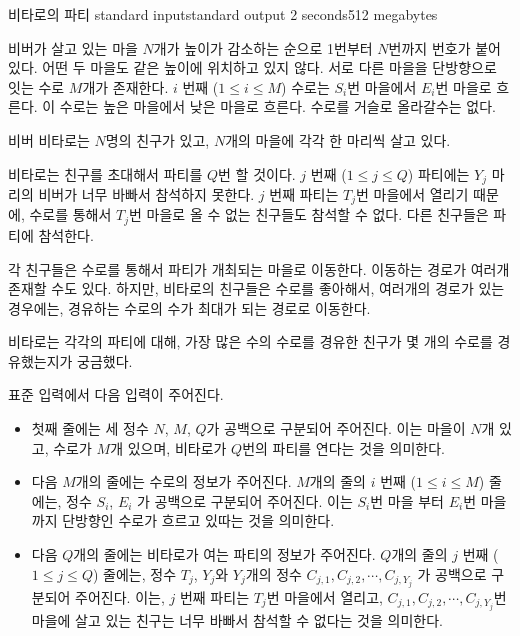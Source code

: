 \begin{problem}{비타로의 파티}
	{standard input}{standard output}
	{2 seconds}{512 megabytes}{}
	
	비버가 살고 있는 마을 $N$개가 높이가 감소하는 순으로 1번부터 $N$번까지 번호가 붙어있다. 어떤 두 마을도 같은 높이에 위치하고 있지 않다. 서로 다른 마을을 단방향으로 잇는 수로 $M$개가 존재한다. $i$ 번째 ($1 \le i \le M$) 수로는 $S_i$번 마을에서 $E_i$번 마을로 흐른다. 이 수로는 높은 마을에서 낮은 마을로 흐른다. 수로를 거슬로 올라갈수는 없다.
	
	비버 비타로는 $N$명의 친구가 있고, $N$개의 마을에 각각 한 마리씩 살고 있다.
	
	비타로는 친구를 초대해서 파티를 $Q$번 할 것이다. $j$ 번째 ($1 \le j \le Q$) 파티에는 $Y_j$ 마리의 비버가 너무 바빠서 참석하지 못한다. $j$ 번째 파티는 $T_j$번 마을에서 열리기 때문에, 수로를 통해서 $T_j$번 마을로 올 수 없는 친구들도 참석할 수 없다. 다른 친구들은 파티에 참석한다.
	
	각 친구들은 수로를 통해서 파티가 개최되는 마을로 이동한다. 이동하는 경로가 여러개 존재할 수도 있다. 하지만, 비타로의 친구들은 수로를 좋아해서, 여러개의 경로가 있는 경우에는, 경유하는 수로의 수가 최대가 되는 경로로 이동한다.
	
	비타로는 각각의 파티에 대해, 가장 많은 수의 수로를 경유한 친구가 몇 개의 수로를 경유했는지가 궁금했다.

	\InputFile
	
	표준 입력에서 다음 입력이 주어진다.
	
	\begin{itemize}
		\item 첫째 줄에는 세 정수 $N$, $M$, $Q$가 공백으로 구분되어 주어진다. 이는 마을이 $N$개 있고, 수로가 $M$개 있으며, 비타로가 $Q$번의 파티를 연다는 것을 의미한다.
		\item 다음 $M$개의 줄에는 수로의 정보가 주어진다. $M$개의 줄의 $i$ 번째 ($1 \le i \le M$) 줄에는, 정수 $S_i$, $E_i$ 가 공백으로 구분되어 주어진다. 이는 $S_i$번 마을 부터 $E_i$번 마을 까지 단방향인 수로가 흐르고 있따는 것을 의미한다.
		\item 다음 $Q$개의 줄에는 비타로가 여는 파티의 정보가 주어진다. $Q$개의 줄의 $j$ 번째 ($1 \le j \le Q$) 줄에는, 정수 $T_j$, $Y_j$와 $Y_j$개의 정수 $C_{j, 1}, C_{j,2 }, \cdots, C_{j, Y_j}$ 가 공백으로 구분되어 주어진다. 이는, $j$ 번째 파티는 $T_j$번 마을에서 열리고, $C_{j, 1}, C_{j, 2}, \cdots, C_{j, Y_j}$번 마을에 살고 있는 친구는 너무 바빠서 참석할 수 없다는 것을 의미한다.
	\end{itemize}
		
	\OutputFile
	

\end{problem}
